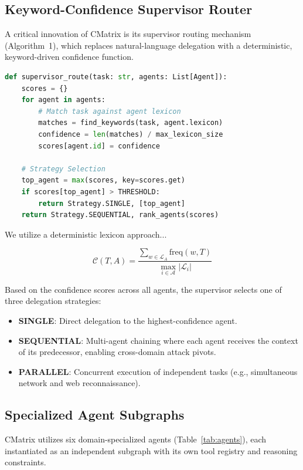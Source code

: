 \documentclass[conference,compsoc]{IEEEtran}
\begin{document}
\subsection{Keyword-Confidence Supervisor Router}
A critical innovation of CMatrix is its supervisor routing mechanism (Algorithm~1), which replaces natural-language delegation with a deterministic, keyword-driven confidence function. 

\begin{lstlisting}[language=Python, caption={CMatrix Supervisor Routing Logic}, label={alg:router}]
def supervisor_route(task: str, agents: List[Agent]):
    scores = {}
    for agent in agents:
        # Match task against agent lexicon
        matches = find_keywords(task, agent.lexicon)
        confidence = len(matches) / max_lexicon_size
        scores[agent.id] = confidence
    
    # Strategy Selection
    top_agent = max(scores, key=scores.get)
    if scores[top_agent] > THRESHOLD:
        return Strategy.SINGLE, [top_agent]
    return Strategy.SEQUENTIAL, rank_agents(scores)
\end{lstlisting}

We utilize a deterministic lexicon approach...

\begin{equation}
\mathcal{C}(T, A) = \frac{\sum_{w \in \mathcal{L}_A} \text{freq}(w, T)}{\max_{i \in \mathcal{A}} |\mathcal{L}_i|}
\end{equation}

Based on the confidence scores across all agents, the supervisor selects one of three delegation strategies:
\begin{itemize}
    \item \textbf{SINGLE}: Direct delegation to the highest-confidence agent.
    \item \textbf{SEQUENTIAL}: Multi-agent chaining where each agent receives the context of its predecessor, enabling cross-domain attack pivots.
    \item \textbf{PARALLEL}: Concurrent execution of independent tasks (e.g., simultaneous network and web reconnaissance).
\end{itemize}

\subsection{Specialized Agent Subgraphs}
CMatrix utilizes six domain-specialized agents (Table~\ref{tab:agents}), each instantiated as an independent subgraph with its own tool registry and reasoning constraints. 
\end{document}

